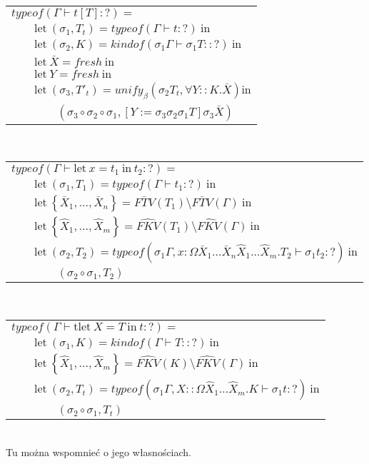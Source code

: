 \documentclass[11pt,leqno]{article}
\begin{document}
\begin{tabular}{l}
$typeof(\Gamma \vdash t[T] : ?) = $ \\
$\qquad \textrm{let} \ (\sigma_1, T_t) = typeof(\Gamma \vdash t : ?) \ \textrm{in} $ \\
$\qquad \textrm{let} \ (\sigma_2, K) = kindof(\sigma_1 \Gamma \vdash \sigma_1 T :: ?) \ \textrm{in} $ \\
$\qquad \textrm{let} \ \bar{X} = fresh \ \textrm{in} $ \\
$\qquad \textrm{let} \ Y = fresh \ \textrm{in} $ \\
$\qquad \textrm{let} \ (\sigma_3, T'_t) = unify_\beta(\sigma_2 T_t, \forall Y::K.\bar{X}) \textrm{in} $ \\
$\qquad\qquad (\sigma_3 \circ \sigma_2 \circ \sigma_1, [Y:=\sigma_3 \sigma_2 \sigma_1 T]\sigma_3\bar{X}) $ \\
\end{tabular} \\
\begin{tabular}{l}
$typeof(\Gamma \vdash \textrm{let} \ x=t_1 \ \textrm{in} \ t_2 : ?) = $ \\
$\qquad \textrm{let} \ (\sigma_1, T_1) = typeof(\Gamma \vdash t_1 : ?) \ \textrm{in} $ \\
$\qquad \textrm{let} \ \left\{ \bar{X}_1, \dots, \bar{X}_n \right\} = \bar{FTV}(T_1) \setminus \bar{FTV}(\Gamma) \ \textrm{in} $ \\
$\qquad \textrm{let} \ \left\{ \widehat{X}_1, \dots, \widehat{X}_m \right\} = \widehat{FKV}(T_1) \setminus \widehat{FKV}(\Gamma) \ \textrm{in} $ \\
$\qquad \textrm{let} \ (\sigma_2, T_2) = typeof(\sigma_1 \Gamma, x:\Omega \bar{X}_1 \dots \bar{X}_n \widehat{X}_1 \dots \widehat{X}_m. T_2 \vdash \sigma_1 t_2 : ?) \ \textrm{in} $ \\
$\qquad\qquad (\sigma_2 \circ \sigma_1, T_2) $ \\
\end{tabular} \\
\begin{tabular}{l}
$typeof(\Gamma \vdash \textrm{tlet} \ X=T \ \textrm{in} \ t : ?) = $ \\
$\qquad \textrm{let} \ (\sigma_1, K) = kindof(\Gamma \vdash T :: ?) \ \textrm{in} $ \\
$\qquad \textrm{let} \ \left\{ \widehat{X}_1, \dots, \widehat{X}_m \right\} = \widehat{FKV}(K) \setminus \widehat{FKV}(\Gamma) \ \textrm{in} $ \\
$\qquad \textrm{let} \ (\sigma_2, T_t) = typeof(\sigma_1 \Gamma, X::\Omega \widehat{X}_1 \dots \widehat{X}_m.K \vdash \sigma_1 t : ?) \ \textrm{in} $ \\
$\qquad\qquad (\sigma_2 \circ \sigma_1, T_t) $ \\
\end{tabular} \\

Tu można wspomnieć o jego własnościach.
\end{document}
